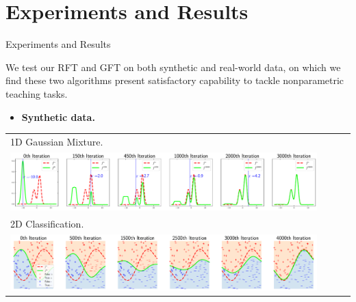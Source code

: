 \documentclass[aspectratio=169,xcolor=dvipsnames]{beamer}
\begin{document}
\section{Experiments and Results}
\begin{frame}{Experiments and Results}

\justify
We test our RFT and GFT on both \alert{synthetic} and \alert{real-world} data, on which we find these two algorithms present satisfactory capability to tackle \alert{nonparametric teaching tasks}.

\vspace{1mm}
\begin{itemize}
    \item {\bf Synthetic data.}
\end{itemize}

\centering
\begin{tabular}{lclc}
{\scriptsize \color{blue} 1D Gaussian Mixture.} \vspace{-1.2mm}\\

\includegraphics[width=0.8\linewidth]{./out/toy/distribution}\vspace{-1.2mm}\\


{\scriptsize \color{blue} 2D Classification.}\vspace{-1.2mm}\\

\includegraphics[width=0.8\linewidth]{./out/toy/classification}
\end{tabular}

\end{frame}
\end{document}
